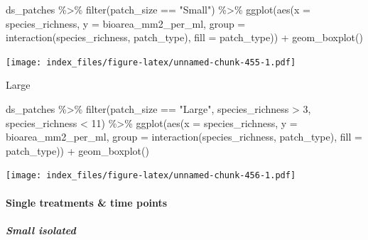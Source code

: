 \documentclass[
]{article}
\newenvironment{Shaded}{\begin{snugshade}}{\end{snugshade}}
\newcommand{\AttributeTok}[1]{\textcolor[rgb]{0.77,0.63,0.00}{#1}}
\newcommand{\DecValTok}[1]{\textcolor[rgb]{0.00,0.00,0.81}{#1}}
\newcommand{\FunctionTok}[1]{\textcolor[rgb]{0.00,0.00,0.00}{#1}}
\newcommand{\NormalTok}[1]{#1}
\newcommand{\SpecialCharTok}[1]{\textcolor[rgb]{0.00,0.00,0.00}{#1}}
\newcommand{\StringTok}[1]{\textcolor[rgb]{0.31,0.60,0.02}{#1}}
\begin{document}
\begin{Shaded}
\begin{Highlighting}[]
\NormalTok{ds\_patches }\SpecialCharTok{\%\textgreater{}\%}
  \FunctionTok{filter}\NormalTok{(patch\_size }\SpecialCharTok{==} \StringTok{"Small"}\NormalTok{) }\SpecialCharTok{\%\textgreater{}\%}
  \FunctionTok{ggplot}\NormalTok{(}\FunctionTok{aes}\NormalTok{(}\AttributeTok{x =}\NormalTok{ species\_richness,}
             \AttributeTok{y =}\NormalTok{ bioarea\_mm2\_per\_ml,}
             \AttributeTok{group =} \FunctionTok{interaction}\NormalTok{(species\_richness, patch\_type),}
             \AttributeTok{fill =}\NormalTok{ patch\_type)) }\SpecialCharTok{+}
  \FunctionTok{geom\_boxplot}\NormalTok{()}
\end{Highlighting}
\end{Shaded}

\texttt{[image: index\_files/figure-latex/unnamed-chunk-455-1.pdf]}

Large

\begin{Shaded}
\begin{Highlighting}[]
\NormalTok{ds\_patches }\SpecialCharTok{\%\textgreater{}\%}
  \FunctionTok{filter}\NormalTok{(patch\_size }\SpecialCharTok{==} \StringTok{"Large"}\NormalTok{,}
\NormalTok{         species\_richness }\SpecialCharTok{\textgreater{}} \DecValTok{3}\NormalTok{,}
\NormalTok{         species\_richness }\SpecialCharTok{\textless{}} \DecValTok{11}\NormalTok{) }\SpecialCharTok{\%\textgreater{}\%}
  \FunctionTok{ggplot}\NormalTok{(}\FunctionTok{aes}\NormalTok{(}\AttributeTok{x =}\NormalTok{ species\_richness,}
             \AttributeTok{y =}\NormalTok{ bioarea\_mm2\_per\_ml,}
             \AttributeTok{group =} \FunctionTok{interaction}\NormalTok{(species\_richness, patch\_type),}
             \AttributeTok{fill =}\NormalTok{ patch\_type)) }\SpecialCharTok{+}
  \FunctionTok{geom\_boxplot}\NormalTok{()}
\end{Highlighting}
\end{Shaded}

\texttt{[image: index\_files/figure-latex/unnamed-chunk-456-1.pdf]}

\hypertarget{single-treatments-time-points}{%
\paragraph{Single treatments \& time
points}\label{single-treatments-time-points}}

\hypertarget{small-isolated}{%
\subparagraph{Small isolated}\label{small-isolated}}
\end{document}
